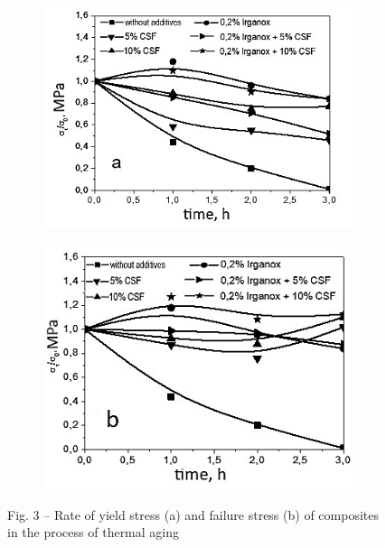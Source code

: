 \begin{figure}[H]
    \centering
    \begin{subfigure}[t]{0.4\textwidth} %
        \centering
        \includegraphics[width=\textwidth]{media/chem/image22}
    \end{subfigure}
    \hspace{0.05\textwidth} %
    \begin{subfigure}[t]{0.4\textwidth} %
        \centering
        \includegraphics[width=\textwidth]{media/chem/image23}
    \end{subfigure}
    \caption*{Fig. 3 -- Rate of yield stress (a) and failure stress (b) of
composites in the process of thermal aging}
\end{figure}

